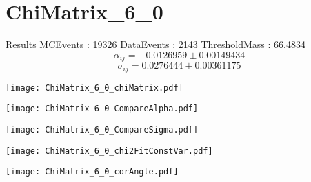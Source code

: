 \documentclass[a4paper,12pt]{article}
\begin{document}
\section{ChiMatrix\_6\_0}
\begin{minipage}{0.49\linewidth} Results \newline
MCEvents : 19326\newline
DataEvents : 2143 \newline
ThresholdMass : 66.4834\\
$$\alpha_{ij} = -0.0126959\pm 0.00149434$$
$$\sigma_{ij} = 0.0276444\pm 0.00361175$$
\end{minipage}\hfill
\begin{minipage}{0.49\linewidth} 
\texttt{[image: ChiMatrix\_6\_0\_chiMatrix.pdf]}\\
\end{minipage}
\hfill
\begin{minipage}{0.49\linewidth} 
\texttt{[image: ChiMatrix\_6\_0\_CompareAlpha.pdf]}\\
\end{minipage}
\hfill
\begin{minipage}{0.49\linewidth} 
\texttt{[image: ChiMatrix\_6\_0\_CompareSigma.pdf]}\\
\end{minipage}
\begin{minipage}{0.49\linewidth} 
\texttt{[image: ChiMatrix\_6\_0\_chi2FitConstVar.pdf]}\\
\end{minipage}
\hfill
\begin{minipage}{0.49\linewidth} 
\texttt{[image: ChiMatrix\_6\_0\_corAngle.pdf]}\\
\end{minipage}
\end{document}
